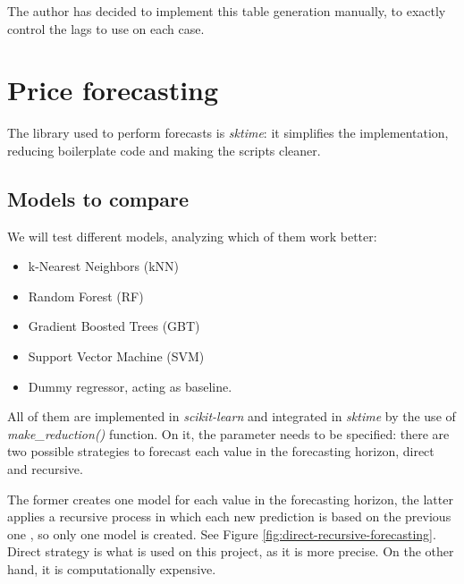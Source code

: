 The author has decided to implement this table generation manually, to exactly control the lags to use on each case.

\section{Price forecasting}
The library used to perform forecasts is \textit{sktime}: it simplifies the implementation, reducing boilerplate code and making the scripts cleaner.

\subsection{Models to compare}
We will test different models, analyzing which of them work better:
\begin{itemize}
    \item k-Nearest Neighbors (kNN)
    \item Random Forest (RF)
    \item Gradient Boosted Trees (GBT)
    \item Support Vector Machine (SVM)
    \item Dummy regressor, acting as baseline.
\end{itemize}
All of them are implemented in \textit{scikit-learn} and integrated in \textit{sktime} by the use of \textit{make\_reduction()} function. On it, the parameter  needs to be specified: there are two possible strategies to forecast each value in the forecasting horizon, direct and recursive.

The former creates one model for each value in the forecasting horizon, the latter applies a recursive process in which each new prediction is based on the previous one \cite{direct-recursive-forecasting}, so only one model is created. See Figure \ref{fig:direct-recursive-forecasting}. Direct strategy is what is used on this project, as it is more precise. On the other hand, it is computationally expensive.

